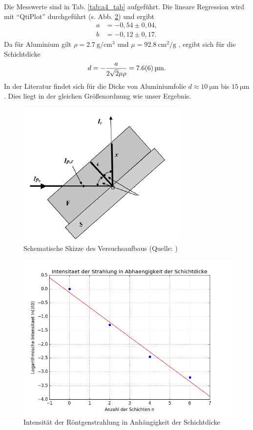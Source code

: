 Die Messwerte sind in Tab. \ref{tab:a4_tab} aufgeführt.
Die lineare Regression wird mit ``QtiPlot'' durchgeführt (s. Abb. \ref{fig:42}) und ergibt
\begin{align}
 a &= -0,54 \pm 0,04, \\
 b &= -0,12 \pm 0,17.
\end{align}
Da für Aluminium gilt $\rho=\SI{2,7}{\gram\per\centi\metre\cubed}$ und $\mu=\SI{92,8}{\centi\metre\squared\per\gram}$ \cite{litmap}, ergibt sich für die Schichtdicke
\begin{equation}
 d = -\frac{a}{2\sqrt{2}\mu\rho} = \SI{7,6\pm0,6}{\micro\metre}.
\end{equation}
In der Literatur findet sich für die Dicke von Aluminiumfolie $d\approx\SI{10}{\micro\metre}$ bis $\SI{15}{\micro\metre}$ \cite{wiki}. Dies liegt in der gleichen Größenordnung wie unser Ergebnis.
%
\begin{figure}[tb]
 \centering
 \includegraphics[scale=0.6]{./fig/a4_bild.png}
 \caption{Schematische Skizze des Versuchsaufbaus (Quelle: \cite{litmap})}
 \label{fig:41}
\end{figure}

\begin{figure}[tb]
 \centering
 \includegraphics[scale=0.6]{./fig/a4_plot.png}
 \caption{Intensität der Röntgenstrahlung in Anhängigkeit der Schichtdicke}
 \label{fig:42}
\end{figure}

